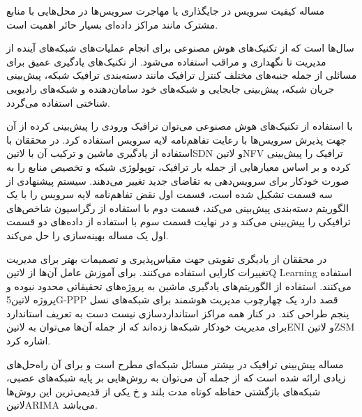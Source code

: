 مساله کیفیت سرویس در جایگذاری یا مهاجرت سرویس‌ها در محل‌هایی با منابع مشترک مانند مراکز داده‌ای بسیار حائر اهمیت است.


سال‌ها است که از تکنیک‌های هوش مصنوعی برای انجام عملیات‌های شبکه‌های آینده از مدیریت تا نگهداری و مراقب استفاده می‌شود. از تکنیک‌های یادگیری عمیق
برای مسائلی از جمله جنبه‌های مختلف کنترل ترافیک مانند دسته‌بندی ترافیک شبکه، پیش‌بینی جریان شبکه، پیش‌بینی جابجایی
و شبکه‌های خود سامان‌دهنده و شبکه‌های رادیویی شناختی
استفاده می‌گردد. 

با استفاده از تکنیک‌های هوش مصنوعی می‌توان ترافیک ورودی را پیش‌بینی کرده از آن جهت پذیرش سرویس‌ها با رعایت تفاهم‌نامه لایه سرویس استفاده کرد. 
در  محققان با استفاده از یادگیری ماشین و ترکیب آن با ‌لاتین{SDN} و ‌لاتین{NFV} ترافیک را پیش‌بینی کرده و بر اساس معیارهایی از جمله بار ترافیک،
توپولوژی شبکه و تخصیص منابع را به صورت خودکار برای سرویس‌دهی به تقاضای جدید تغییر می‌دهند. سیستم پیشنهادی  از سه قسمت تشکیل شده است، قسمت اول
نقض تفاهم‌نامه لایه سرویس را با یک الگوریتم دسته‌بندی پیش‌بینی می‌کند، قسمت دوم با استفاده از رگراسیون شاخص‌های ترافیکی را پیش‌بینی می‌کند و در نهایت قسمت سوم با استفاده از
داده‌های دو قسمت اول یک مساله بهینه‌سازی را حل می‌کند.

در  محققان از یادیگری تقویتی جهت مقیاس‌پذیری و تصمیمات بهتر برای مدیریت تغییرات کارایی استفاده می‌کنند. برای آموزش عامل آن‌ها از ‌لاتین{Q Learning}
استفاده می‌کنند. استفاده از الگوریتم‌های یادگیری ماشین به پروژه‌های تحقیقاتی محدود نبوده و پروژه ‌لاتین{5G-PPP} قصد دارد یک چهارچوب مدیریت هوشمند برای شبکه‌های نسل پنجم
طراحی کند. در کنار همه مراکز استانداردسازی نیست دست به تعریف استاندارد برای مدیریت خودکار شبکه‌ها زده‌اند که از جمله آن‌ها می‌توان به ‌لاتین{ENI} و ‌لاتین{ZSM} اشاره کرد.

مساله پیش‌بینی ترافیک در بیشتر مسائل شبکه‌ای مطرح است و برای آن راه‌حل‌های زیادی ارائه شده است که از جمله آن می‌توان به روش‌هایی بر پایه شبکه‌های عصبی،
شبکه‌های بازگشتی حفاظه کوتاه مدت بلند و ‌خ
یکی از قدیمی‌ترین این روش‌ها ‌لاتین{ARIMA} می‌باشد.
